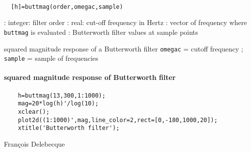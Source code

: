 
\begin{mandesc}
   \\ %
\end{mandesc}
\begin{calling_sequence}
\begin{verbatim}
  [h]=buttmag(order,omegac,sample)  
\end{verbatim}
\end{calling_sequence}
\begin{parameters}
  \begin{varlist}
    : integer: filter order
    : real: cut-off frequency in Hertz
    : vector of frequency where \verb!buttmag! is evaluated
    : Butterworth filter values at sample points
  \end{varlist}
\end{parameters}
\begin{mandescription}
  squared magnitude response of a Butterworth filter
  \verb!omegac! = cutoff frequency ; \verb!sample! = sample of frequencies
\end{mandescription}
\begin{examples}
  \paragraph{squared magnitude response of Butterworth filter}
  \begin{Verbatim}
    h=buttmag(13,300,1:1000);
    mag=20*log(h)'/log(10);
    xclear();
    plot2d((1:1000)',mag,line_color=2,rect=[0,-180,1000,20]);
    xtitle('Butterworth filter');
  \end{Verbatim}
\end{examples}
\begin{authors}
  Fran\c{c}ois  Delebecque  
\end{authors}
